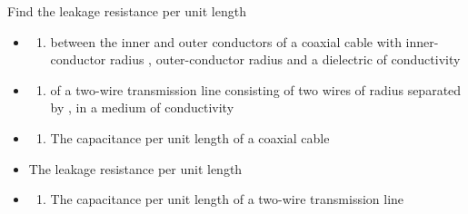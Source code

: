 
\begin{ELexample}{}

Find the leakage resistance per unit length

\begin{itemize}
\item
  \begin{enumerate}
  \def\labelenumi{(\alph{enumi})}
  \tightlist
  \item
    between the inner and outer conductors of a coaxial cable with inner-conductor radius , outer-conductor radius  and a dielectric of conductivity \ELim{\sigma}
  \end{enumerate}
\item
  \begin{enumerate}
  \def\labelenumi{(\alph{enumi})}
  \setcounter{enumi}{1}
  \tightlist
  \item
    of a two-wire transmission line consisting of two wires of radius  separated by , in a medium of conductivity \ELim{\sigma}
  \end{enumerate}
\end{itemize}

\begin{ELsolution}

\begin{itemize}
\item
  \begin{enumerate}
  \def\labelenumi{(\alph{enumi})}
  \tightlist
  \item
    The capacitance per unit length of a coaxial cable
  \end{enumerate}
\end{itemize}


\begin{itemize}
\tightlist
\item
  The leakage resistance per unit length
\end{itemize}


\begin{itemize}
\item
  \begin{enumerate}
  \def\labelenumi{(\alph{enumi})}
  \setcounter{enumi}{1}
  \tightlist
  \item
    The capacitance per unit length of a two-wire transmission line
  \end{enumerate}
\end{itemize}


\end{ELsolution}
\end{ELexample}
